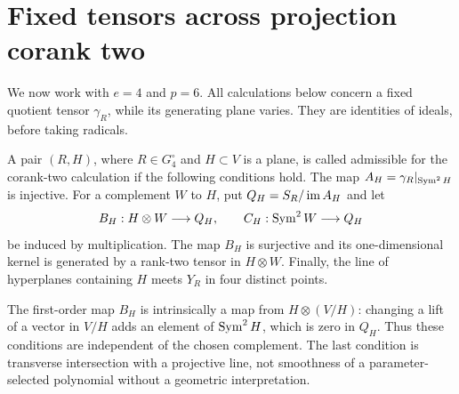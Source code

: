 \section{Fixed tensors across projection corank two}
\label{sec:coranktwo}
We now work with $e=4$ and $p=6$. All calculations below concern a
fixed quotient tensor $\gamma_R$, while its generating plane varies.
They are identities of ideals, before taking radicals.

\begin{definition}\label{def:good-pair}
A pair $(R,H)$, where $R\in G_4^\circ$ and $H\subset V$ is a
plane, is called admissible for the corank-two calculation if the
following conditions hold. The map
$A_H=\gamma_R|_{\operatorname{Sym}^2H}$ is injective. For a complement $W$ to $H$,
put $Q_H=S_R/\operatorname{im} A_H$ and let
\[
 B_H:H\otimes W\longrightarrow Q_H,\qquad
 C_H:\operatorname{Sym}^2W\longrightarrow Q_H
\]
be induced by multiplication. The map $B_H$ is surjective and its
one-dimensional kernel is generated by a rank-two tensor in
$H\otimes W$. Finally, the line of hyperplanes containing $H$
meets $Y_R$ in four distinct points.
\end{definition}
The first-order map $B_H$ is intrinsically a map from $H\otimes(V/H)$:
changing a lift of a vector in $V/H$ adds an element of $\operatorname{Sym}^2H$,
which is zero in $Q_H$. Thus these conditions are independent of the
chosen complement. The last condition is transverse intersection with
a projective line, not smoothness of a parameter-selected polynomial
without a geometric interpretation.

